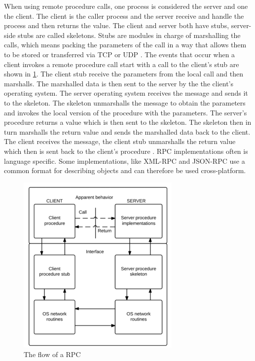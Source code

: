 When using remote procedure calls, one process is considered the server and one the client. The client is the caller process and the server receive and handle the process and then returns the value. The client and server both have stubs, server-side stubs are called skeletons. Stubs are modules in charge of marshalling the calls, which means packing the parameters of the call in a way that allows them to be stored or transferred via TCP or UDP \cite{rfc5531}. 
The events that occur when a client invokes a remote procedure call start with a call to the client's stub are shown in \ref{rpcflow}. The client stub receive the parameters from the local call and then marshalls. The marshalled data is then sent to the server by the the client's operating system. The server operating system receives the message and sends it to the skeleton. The skeleton unmarshalls the message  to obtain the parameters and invokes the local version of the procedure with the parameters. The server's procedure returns a value which is then sent to the skeleton. The skeleton then in turn marshalls the return value and sends the marshalled data back to the client. The client receives the message, the client stub unmarshalls the return value which then is sent back to the client's procedure \cite{Lewandowski97interprocesscommunication}. RPC implementations often is language specific. Some implementations, like XML-RPC and 
JSON-RPC use a common format for describing objects and can therefore be used cross-platform.

\begin{figure}[ht]
		\centering	\includegraphics{part_2/remote_procedure_calls/Rpcflow300.png}
		\caption{The flow of a RPC}
		\label{rpcflow} 
\end{figure}

